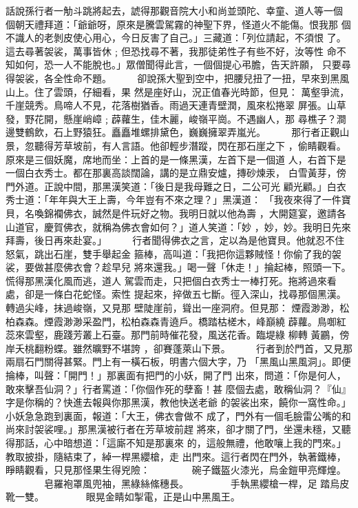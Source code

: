 \begin{pinyinscope}
{話說孫行者一觔斗跳將起去，諕得那觀音院大小和尚並頭陀、幸童、道人等一個
個朝天禮拜道：「爺爺呀，原來是騰雲駕霧的神聖下界，怪道火不能傷。恨我那
個不識人的老剝皮使心用心，今日反害了自己。」三藏道：「列位請起，不須恨
了。這去尋著袈裟，萬事皆休﹔但恐找尋不著，我那徒弟性子有些不好，汝等性
命不知如何，恐一人不能脫也。」眾僧聞得此言，一個個提心弔膽，告天許願，
只要尋得袈裟，各全性命不題。
　　
卻說孫大聖到空中，把腰兒扭了一扭，早來到黑風山上。住了雲頭，仔細看，果
然是座好山，況正值春光時節，但見：
萬壑爭流，千崖競秀。鳥啼人不見，花落樹猶香。雨過天連青壁潤，風來松捲翠
屏張。山草發，野花開，懸崖峭嶂﹔薜蘿生，佳木麗，峻嶺平崗。不遇幽人，那
尋樵子？澗邊雙鶴飲，石上野猿狂。矗矗堆螺排黛色，巍巍擁翠弄嵐光。
　　
那行者正觀山景，忽聽得芳草坡前，有人言語。他卻輕步潛蹤，閃在那石崖之下
，偷睛觀看。原來是三個妖魔，席地而坐：上首的是一條黑漢，左首下是一個道
人，右首下是一個白衣秀士。都在那裏高談闊論，講的是立鼎安爐，摶砂煉汞，
白雪黃芽，傍門外道。正說中間，那黑漢笑道：「後日是我母難之日，二公可光
顧光顧。」白衣秀士道：「年年與大王上壽，今年豈有不來之理？」黑漢道：
「我夜來得了一件寶貝，名喚錦襴佛衣，誠然是件玩好之物。我明日就以他為壽
，大開筵宴，邀請各山道官，慶賀佛衣，就稱為佛衣會如何？」道人笑道：「妙
，妙，妙。我明日先來拜壽，後日再來赴宴。」
　　
行者聞得佛衣之言，定以為是他寶貝。他就忍不住怒氣，跳出石崖，雙手舉起金
箍棒，高叫道：「我把你這夥賊怪！你偷了我的袈裟，要做甚麼佛衣會？趁早兒
將來還我。」喝一聲「休走！」掄起棒，照頭一下。慌得那黑漢化風而逃，道人
駕雲而走，只把個白衣秀士一棒打死。拖將過來看處，卻是一條白花蛇怪。索性
提起來，捽做五七斷。徑入深山，找尋那個黑漢。轉過尖峰，抹過峻嶺，又見那
壁陡崖前，聳出一座洞府。但見那：
煙霞渺渺，松柏森森。煙霞渺渺采盈門，松柏森森青遶戶。橋踏枯槎木，峰巔繞
薜蘿。鳥啣紅蕊來雲壑，鹿踐芳叢上石臺。那門前時催花發，風送花香。臨堤綠
柳轉 黃鸝，傍岸夭桃翻粉蝶。雖然曠野不堪誇 ，卻賽蓬萊山下景。
　　
行者到於門首，又見那兩扇石門關得甚緊。門上有一橫石板，明書六個大字，乃
「黑風山黑風洞」。即便掄棒，叫聲：「開門！」那裏面有把門的小妖，開了門
出來，問道：「你是何人，敢來擊吾仙洞？」行者罵道：「你個作死的孽畜！甚
麼個去處，敢稱仙洞？『仙』字是你稱的？快進去報與你那黑漢，教他快送老爺
的袈裟出來，饒你一窩性命。」小妖急急跑到裏面，報道：「大王，佛衣會做不
成了，門外有一個毛臉雷公嘴的和尚來討袈裟哩。」那黑漢被行者在芳草坡前趕
將來，卻才關了門，坐還未穩，又聽得那話，心中暗想道：「這廝不知是那裏來
的，這般無禮，他敢嚷上我的門來。」教取披掛，隨結束了，綽一桿黑纓槍，走
出門來。這行者閃在門外，執著鐵棒，睜睛觀看，只見那怪果生得兇險：
　　　　碗子鐵盔火漆光，烏金鎧甲亮輝煌。
　　　　皂羅袍罩風兜袖，黑綠絲絛穗長。
　　　　手執黑纓槍一桿，足 踏烏皮靴一雙。
　　　　眼晃金睛如掣電，正是山中黑風王。

}
\end{pinyinscope}
